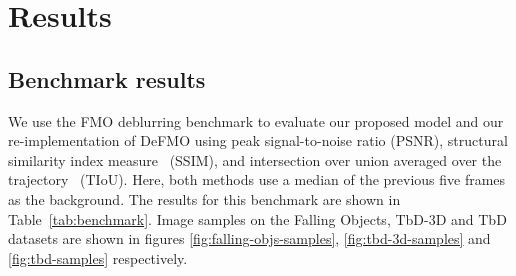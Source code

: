 \newcommand{\samples}[2]{%
    \begin{figure}
        \centering

        \begin{subfigure}{0.19\textwidth}
            \texttt{[image: images/results/\#1.jpg]}
            \caption*{Input}
        \end{subfigure}
        \hfill
        \begin{subfigure}{0.79\textwidth}
            \setlength{\abovecaptionskip}{1mm}
            \foreach [count=\i from 1] \method/\name in {GT/gt,DeFMO/old,Proposed/new}{%
                \begin{subfigure}{\textwidth}
                    \rotatebox{90}{\method}
                    \foreach \j in {0,...,7}{%
                        \texttt{[image: images/results/\\name/\#1-\\j.jpg]}%
                        \ifthenelse{\equal{\j}{7}}{}{\hfill}%
                    }
                \end{subfigure}%
                \ifthenelse{\equal{\i}{3}}{}{\vspace{1mm}}
            }
            \caption*{Output}
        \end{subfigure}

        \caption{Sample outputs on the #2 dataset.}%
        \label{fig:#1-samples}
    \end{figure}
}

\section{Results}

\subsection{Benchmark results}
    We use the FMO deblurring benchmark to evaluate our proposed model and our re-implementation of DeFMO using peak signal-to-noise ratio (PSNR), structural similarity index measure~\citep{ssim} (SSIM), and intersection over union averaged over the trajectory~\citep{tiou} (TIoU).
    Here, both methods use a median of the previous five frames as the background.
    The results for this benchmark are shown in Table~\ref{tab:benchmark}.
    Image samples on the Falling Objects, TbD-3D and TbD datasets are shown in figures \ref{fig:falling-objs-samples}, \ref{fig:tbd-3d-samples} and \ref{fig:tbd-samples} respectively.%

